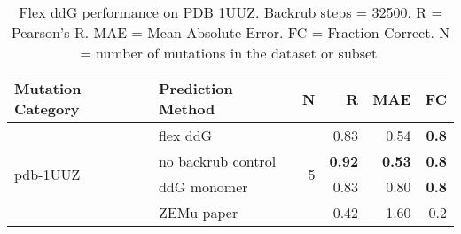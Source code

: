 \begin{table}
  \begin{tabular}{llrrrr}
\toprule
Mutation Category &   Prediction Method &  N &    R &  MAE &  FC \\
\midrule
 \multirow{ 4}{*}{pdb-1UUZ} & flex ddG & \multirow{ 4}{*}{5} & 0.83 & 0.54 & \textbf{0.8}  \\
 & no backrub control & & \textbf{0.92} & \textbf{0.53} & \textbf{0.8}  \\
 & ddG monomer & & 0.83 & 0.80 & \textbf{0.8}  \\
 & ZEMu paper & & 0.42 & 1.60 & 0.2  \\
\bottomrule
\end{tabular}
  \caption[Flex ddG performance on PDB 1UUZ]{
    Flex ddG performance on PDB 1UUZ. Backrub steps = 32500. R = Pearson's R. MAE = Mean Absolute Error. FC = Fraction Correct. N = number of mutations in the dataset or subset.
  } \label{tab:table-pdb-1UUZ}
\end{table}
